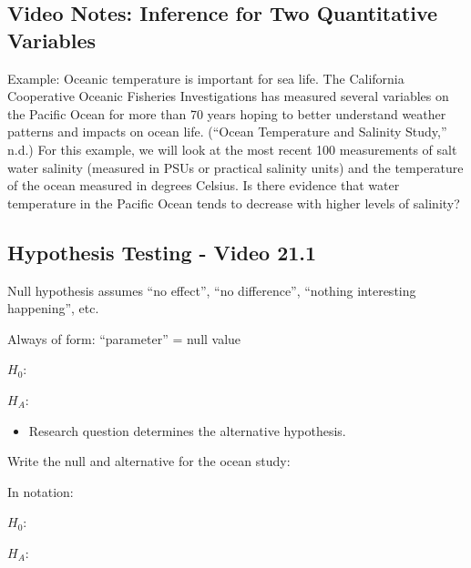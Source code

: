 \documentclass[
]{report}
\providecommand{\tightlist}{%
  \setlength{\itemsep}{0pt}\setlength{\parskip}{0pt}}
\newcommand{\rgi}{\hspace{24pt}}  %
\begin{document}
\vspace{0.2in}
\newpage

\subsection{Video Notes: Inference for Two Quantitative Variables}\label{video-notes-inference-for-two-quantitative-variables}


Example: Oceanic temperature is important for sea life. The California Cooperative Oceanic Fisheries Investigations has measured several variables on the Pacific Ocean for more than 70 years hoping to better understand weather patterns and impacts on ocean life. ({``Ocean Temperature and Salinity Study,''} n.d.) For this example, we will look at the most recent 100 measurements of salt water salinity (measured in PSUs or practical salinity units) and the temperature of the ocean measured in degrees Celsius. Is there evidence that water temperature in the Pacific Ocean tends to decrease with higher levels of salinity?

\subsection*{Hypothesis Testing - Video 21.1}\label{hypothesis-testing---video-21.1}

Null hypothesis assumes ``no effect'', ``no difference'', ``nothing interesting happening'', etc.

\rgi Always of form: ``parameter'' = null value

\(H_0:\)

\vspace{0.5in}

\(H_A:\)

\vspace{0.5in}

\begin{itemize}
\tightlist
\item
  Research question determines the alternative hypothesis.
\end{itemize}

Write the null and alternative for the ocean study:

In notation:

\(H_0:\)

\vspace{0.2in}

\(H_A:\)
\end{document}
